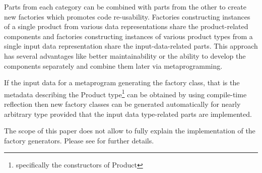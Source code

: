 Parts from each category can be combined with parts from the other to create new
factories which promotes code re-usability. Factories constructing instances of a single
product from various data representations share the product-related components
and factories constructing instances of various product types from a single input data representation
share the input-data-related parts. This approach has several advantages like better
maintainability or the ability to develop the components separately and combine them later
via metaprogramming.

If the input data for a metaprogram generating the factory class, that is
the metadata describing the Product type\footnote{specifically the constructors of Product}
can be obtained by using compile-time reflection then new factory classes can be generated
automatically for nearly arbitrary type provided that the input data type-related parts are
implemented.

The scope of this paper does not allow to fully explain the implementation
of the factory generators. Please see \cite{Chochlik-CAI} for further details.
